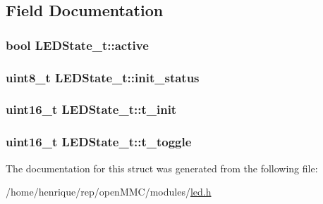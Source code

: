 \subsection{Field Documentation}
\hypertarget{structLEDState__t_a4dfa4c1e6cd639eb91ad48d7c877d1ea}{
\subsubsection[{active}]{\setlength{\rightskip}{0pt plus 5cm}bool L\-E\-D\-State\-\_\-t\-::active}}\label{structLEDState__t_a4dfa4c1e6cd639eb91ad48d7c877d1ea}
\hypertarget{structLEDState__t_a447f02dbcc11821ccd1b25f9fb6aaf43}{
\subsubsection[{init\-\_\-status}]{\setlength{\rightskip}{0pt plus 5cm}uint8\-\_\-t L\-E\-D\-State\-\_\-t\-::init\-\_\-status}}\label{structLEDState__t_a447f02dbcc11821ccd1b25f9fb6aaf43}
\hypertarget{structLEDState__t_a8ef9c73d79bf547466153ab408d762c4}{
\subsubsection[{t\-\_\-init}]{\setlength{\rightskip}{0pt plus 5cm}uint16\-\_\-t L\-E\-D\-State\-\_\-t\-::t\-\_\-init}}\label{structLEDState__t_a8ef9c73d79bf547466153ab408d762c4}
\hypertarget{structLEDState__t_af8eb5cb09efdf634498a0078b263d620}{
\subsubsection[{t\-\_\-toggle}]{\setlength{\rightskip}{0pt plus 5cm}uint16\-\_\-t L\-E\-D\-State\-\_\-t\-::t\-\_\-toggle}}\label{structLEDState__t_af8eb5cb09efdf634498a0078b263d620}


The documentation for this struct was generated from the following file\-:\begin{DoxyCompactItemize}
\item 
/home/henrique/rep/open\-M\-M\-C/modules/\hyperlink{led_8h}{led.\-h}\end{DoxyCompactItemize}
